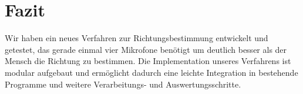 \section{Fazit} 
Wir haben ein neues Verfahren zur Richtungsbestimmung entwickelt und getestet, das gerade einmal vier Mikrofone benötigt um deutlich besser als der Mensch die Richtung zu bestimmen. Die Implementation unseres Verfahrens ist modular aufgebaut und ermöglicht dadurch eine leichte Integration in bestehende Programme und weitere Verarbeitungs- und Auswertungsschritte.